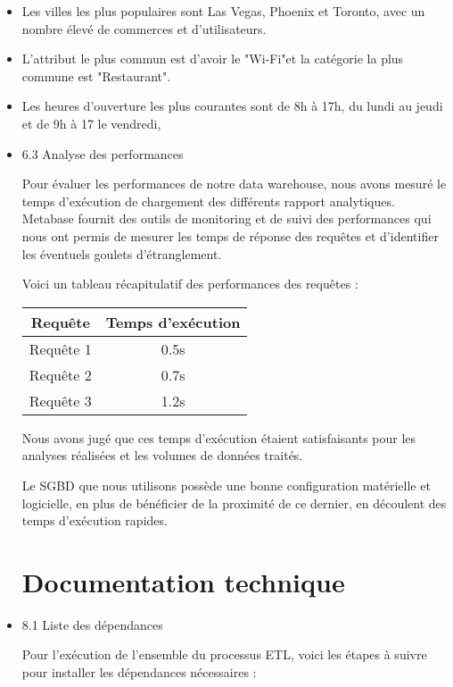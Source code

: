 \begin{itemize}
\begin{itemize}
\item Les villes les plus populaires sont Las Vegas, Phoenix et Toronto, avec un nombre élevé de commerces et d'utilisateurs.

\item L'attribut le plus commun est d'avoir le "Wi-Fi"et la catégorie la plus commune est "Restaurant".

\item Les heures d'ouverture les plus courantes sont de 8h à 17h, du lundi au jeudi et de 9h à 17 le vendredi,


\item 6.3 Analyse des performances

Pour évaluer les performances de notre data warehouse, nous avons mesuré le temps d’exécution de chargement des différents rapport analytiques.
Metabase fournit des outils de monitoring et de suivi des performances qui nous ont permis de mesurer les temps de réponse des requêtes et d’identifier les éventuels goulets d’étranglement.

Voici un tableau récapitulatif des performances des requêtes :

\begin{center}
\begin{tabular}{|c|c|}
\hline
Requête & Temps d'exécution \\
\hline
Requête 1 & 0.5s \\
\hline
Requête 2 & 0.7s \\
\hline
Requête 3 & 1.2s \\
\hline
\end{tabular}
\end{center}

Nous avons jugé que ces temps d'exécution étaient satisfaisants pour les analyses réalisées et les volumes de données traités.

Le SGBD que nous utilisons possède une bonne configuration matérielle et logicielle, en plus de bénéficier de la proximité de ce dernier, en découlent des temps d'exécution rapides.



\chapter*{Documentation technique}



\item 8.1 Liste des dépendances

Pour l’exécution de l'ensemble du processus ETL, voici les étapes à suivre pour installer les dépendances nécessaires :


\end{itemize}
\end{itemize}
